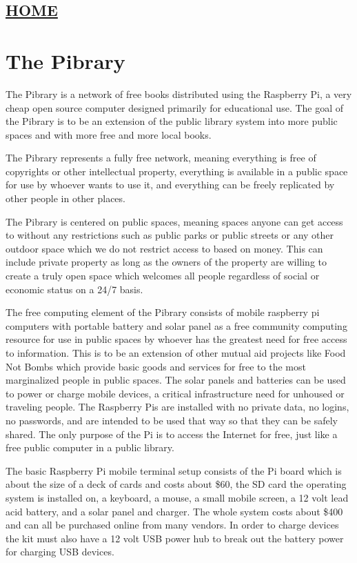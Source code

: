 \hypertarget{home}{%
\subsection{\texorpdfstring{\href{scrolls/home}{HOME}}{HOME}}\label{home}}

\hypertarget{the-pibrary}{%
\section{The Pibrary}\label{the-pibrary}}

The Pibrary is a network of free books distributed using the Raspberry
Pi, a very cheap open source computer designed primarily for educational
use. The goal of the Pibrary is to be an extension of the public library
system into more public spaces and with more free and more local books.

The Pibrary represents a fully free network, meaning everything is free
of copyrights or other intellectual property, everything is available in
a public space for use by whoever wants to use it, and everything can be
freely replicated by other people in other places.

The Pibrary is centered on public spaces, meaning spaces anyone can get
access to without any restrictions such as public parks or public
streets or any other outdoor space which we do not restrict access to
based on money. This can include private property as long as the owners
of the property are willing to create a truly open space which welcomes
all people regardless of social or economic status on a 24/7 basis.

The free computing element of the Pibrary consists of mobile raspberry
pi computers with portable battery and solar panel as a free community
computing resource for use in public spaces by whoever has the greatest
need for free access to information. This is to be an extension of other
mutual aid projects like Food Not Bombs which provide basic goods and
services for free to the most marginalized people in public spaces. The
solar panels and batteries can be used to power or charge mobile
devices, a critical infrastructure need for unhoused or traveling
people. The Raspberry Pis are installed with no private data, no logins,
no passwords, and are intended to be used that way so that they can be
safely shared. The only purpose of the Pi is to access the Internet for
free, just like a free public computer in a public library.

The basic Raspberry Pi mobile terminal setup consists of the Pi board
which is about the size of a deck of cards and costs about \$60, the SD
card the operating system is installed on, a keyboard, a mouse, a small
mobile screen, a 12 volt lead acid battery, and a solar panel and
charger. The whole system costs about \$400 and can all be purchased
online from many vendors. In order to charge devices the kit must also
have a 12 volt USB power hub to break out the battery power for charging
USB devices.

